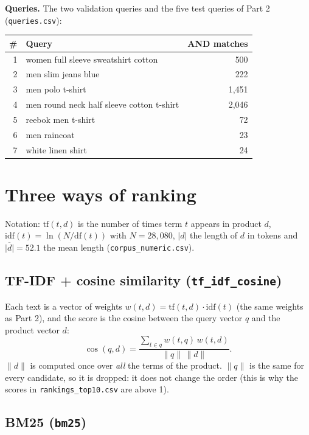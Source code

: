 \documentclass[10pt,a4paper]{article}
\newcommand{\file}[1]{\texttt{\small #1}}
\begin{document}
\textbf{Queries.} The two validation queries and the five test queries of Part 2 (\file{queries.csv}):

\begin{table}[H]
\centering\small
\begin{tabular}{r l r}
\toprule
\# & Query & AND matches \\
\midrule
1 & women full sleeve sweatshirt cotton & 500 \\
2 & men slim jeans blue & 222 \\
3 & men polo t-shirt & 1,451 \\
4 & men round neck half sleeve cotton t-shirt & 2,046 \\
5 & reebok men t-shirt & 72 \\
6 & men raincoat & 23 \\
7 & white linen shirt & 24 \\
\bottomrule
\end{tabular}
\end{table}

\section{Three ways of ranking}

Notation: $\mathrm{tf}(t,d)$ is the number of times term $t$ appears in product $d$,
$\mathrm{idf}(t)=\ln(N/\mathrm{df}(t))$ with $N=28{,}080$, $|d|$ the length of $d$ in tokens and
$\overline{|d|}=52.1$ the mean length (\file{corpus\_numeric.csv}).

\subsection{TF-IDF + cosine similarity (\file{tf\_idf\_cosine})}

Each text is a vector of weights $w(t,d)=\mathrm{tf}(t,d)\cdot\mathrm{idf}(t)$ (the same weights as Part 2),
and the score is the cosine between the query vector $q$ and the product vector $d$:
\[
\cos(q,d)=\frac{\sum_{t\in q} w(t,q)\,w(t,d)}{\lVert q\rVert\,\lVert d\rVert}.
\]
$\lVert d\rVert$ is computed once over \emph{all} the terms of the product. $\lVert q\rVert$ is the same
for every candidate, so it is dropped: it does not change the order (this is why the scores in
\file{rankings\_top10.csv} are above 1).

\subsection{BM25 (\file{bm25})}
\end{document}
